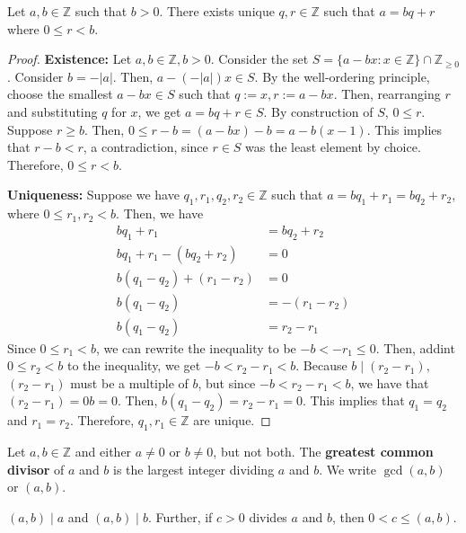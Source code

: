 \documentclass [12pt] {article}
\newcommand{\Z}{\mathbb{Z}}
\newenvironment{definition}[1]{\begin{tcolorbox}[title={Definition: #1},colback=blue!5!white,colframe=black!75!blue]}{\end{tcolorbox}}
\newenvironment{theorem}[1]{\begin{tcolorbox}[title={Theorem #1},colback=green!5!white,colframe=black!75!green]}{\end{tcolorbox}}
\renewcommand{\bf}[1]{\textbf{{#1}}}
\begin{document}
\begin{theorem}{(Division Algorithm)}
    \label{thm:divalgo}
    Let $a, b \in \Z$ such that $b > 0$. There exists unique $q, r \in \Z$ such that $a = bq + r$
    where $0 \leq r < b$.
\end{theorem}
\begin{proof}
    \bf{Existence:} 
    Let $a, b \in \Z, b > 0$. Consider the set $S = \{ a - bx : x \in \Z \} \cap \Z_{\geq 0}$.
    Consider $b = -|a|$. Then, $a - (-|a|)x \in S$. By the well-ordering principle, choose the 
    smallest $a - bx \in S$ such that $q := x, r := a - bx$. Then, rearranging $r$ and substituting
    $q$ for $x$, we get $a = bq + r \in S$. By construction of $S$, $0 \leq r$. Suppose $r \geq b$.
    Then, $0 \leq r - b = (a - bx) - b = a - b(x - 1)$. This implies that $r - b < r$, a
    contradiction, since $r \in S$ was the least element by choice. Therefore, $0 \leq r < b$.
    \vspace{0.5em}

    \bf{Uniqueness:}
    Suppose we have $q_1, r_1, q_2, r_2 \in \Z$ such that $a = bq_1 + r_1 = bq_2 + r_2$, where 
    $0 \leq r_1, r_2 < b$. Then, we have
    \begin{align*}
        bq_1 + r_1 &= bq_2 + r_2 \\
        bq_1 + r_1 - (bq_2 + r_2) &= 0 \\
        b(q_1 - q_2) + (r_1 - r_2) &= 0 \\
        b(q_1 - q_2) &= -(r_1 - r_2) \\
        b(q_1 - q_2) &= r_2 - r_1
    \end{align*}
    Since $0 \leq r_1 < b$, we can rewrite the inequality to be $-b < -r_1 \leq 0$. Then, addint $0
    \leq r_2 < b$ to the inequality, we get $-b < r_2 - r_1 < b$. Because $b \mid (r_2 - r_1)$,
    $(r_2 - r_1)$ must be a multiple of $b$, but since $-b < r_2 - r_1 < b$, we have that 
    $(r_2 - r_1) = 0b = 0$. Then, $b(q_1 - q_2) = r_2 - r_1 = 0$. This implies that $q_1 = q_2$ and
    $r_1 = r_2$. Therefore, $q_1, r_1 \in \Z$ are unique.
\end{proof}

\begin{definition}{Greatest Common Divisor (gcd)}
    Let $a, b \in \Z$ and either $a \neq 0$ or $b \neq 0$, but not both. The \bf{greatest common
    divisor} of $a$ and $b$ is the largest integer dividing $a$ and $b$. We write $\gcd(a, b)$ or
    $(a, b)$. \vspace{1em}

    $(a, b) \mid a$ and $(a, b) \mid b$. Further, if $c > 0$ divides $a$ and $b$, then $0 < c \leq (a, b)$.
\end{definition}
\end{document}
